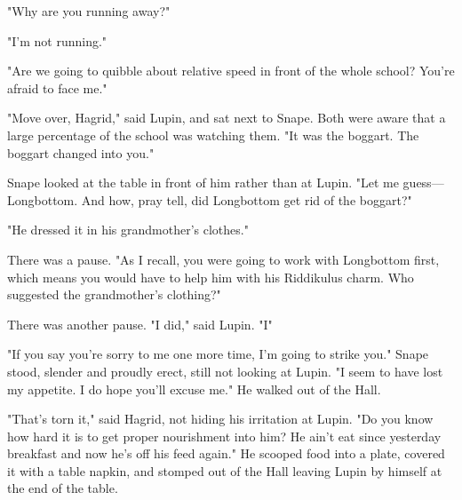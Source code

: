 "Why are you running away?"

"I'm not running."

"Are we going to quibble about relative speed in front of the whole school? You're afraid to face me."

"Move over, Hagrid," said Lupin, and sat next to Snape. Both were aware that a large percentage of the school was watching them. "It was the boggart. The boggart changed into you."

Snape looked at the table in front of him rather than at Lupin. "Let me guess—Longbottom. And how, pray tell, did Longbottom get rid of the boggart?"

"He dressed it in his grandmother's clothes."

There was a pause. "As I recall, you were going to work with Longbottom first, which means you would have to help him with his Riddikulus charm. Who suggested the grandmother's clothing?"

There was another pause. "I did," said Lupin. "I{\el}"

"If you say you're sorry to me one more time, I'm going to strike you." Snape stood, slender and proudly erect, still not looking at Lupin. "I seem to have lost my appetite. I do hope you'll excuse me." He walked out of the Hall.

"That's torn it," said Hagrid, not hiding his irritation at Lupin. "Do you know how hard it is to get proper nourishment into him? He ain't eat since yesterday breakfast and now he's off his feed again." He scooped food into a plate, covered it with a table napkin, and stomped out of the Hall leaving Lupin by himself at the end of the table.


